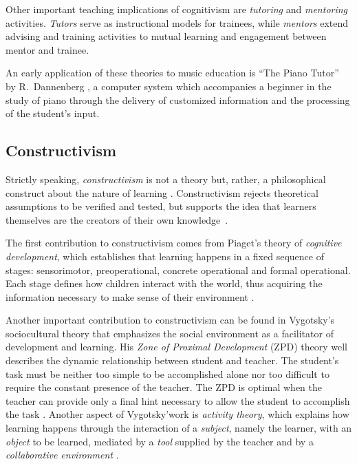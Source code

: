 \documentclass[journal]{IEEEtran}
\begin{document}
Other important teaching implications of cognitivism are \textit{tutoring} and \textit{mentoring} activities. \textit{Tutors} serve as instructional models for trainees, while \textit{mentors} extend advising and training activities to mutual learning and engagement between mentor and trainee. 

An early application of these theories to music education is ``The Piano Tutor'' by R.\ Dannenberg \cite{dannenberg1990computer}, a computer system which accompanies a beginner in the study of piano through the delivery of customized information and the processing of the student's input.

\subsection{Constructivism}

Strictly speaking, \textit{constructivism} is not a theory but, rather, a philosophical construct about the nature of learning  \cite{hyslop2007constructivism}. Constructivism rejects theoretical assumptions to be verified and tested, but supports the idea that learners themselves are the creators of their own knowledge~\cite{geary1995reflections}. 

The first contribution to constructivism comes from Piaget's theory of \textit{cognitive development}, which establishes that learning happens in a fixed sequence of stages: sensorimotor, preoperational, concrete operational and formal operational. Each stage defines how children interact with the world, thus acquiring the information necessary to make sense of their environment \cite{piaget1952origins}. 

Another important contribution to constructivism can be found in Vygotsky's sociocultural theory that emphasizes the social environment as a facilitator of development and learning. His \textit{Zone of Proximal Development} (ZPD) theory well describes the dynamic relationship between student and teacher. The student's task must be neither too simple to be accomplished alone nor too difficult to require the constant presence of the teacher. The ZPD is optimal when the teacher can provide only a final hint necessary to allow the student to accomplish the task \cite{vygotsky1980mind}. Another aspect of Vygotsky'work is \textit{activity theory}, which explains how learning happens through the interaction of a \textit{subject}, namely the learner, with an \textit{object} to be learned, mediated by a \textit{tool} supplied by the teacher and by a \textit{collaborative environment} 
\cite{jonassen1999activity}.
\end{document}
